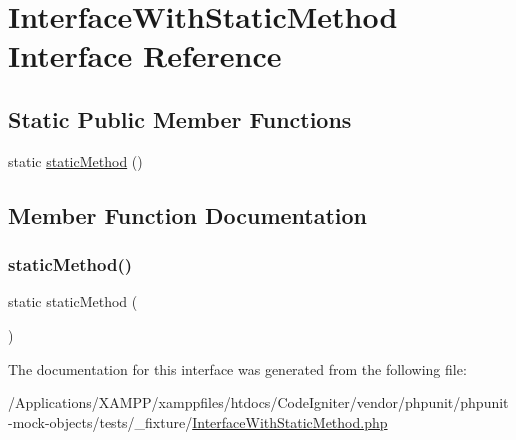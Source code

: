 \hypertarget{interface_interface_with_static_method}{}\section{Interface\+With\+Static\+Method Interface Reference}
\label{interface_interface_with_static_method}
\subsection*{Static Public Member Functions}
\begin{DoxyCompactItemize}
\item 
static \mbox{\hyperlink{interface_interface_with_static_method_a15469694bbe0f96a3e717f2796a00330}{static\+Method}} ()
\end{DoxyCompactItemize}


\subsection{Member Function Documentation}
\mbox{\label{interface_interface_with_static_method_a15469694bbe0f96a3e717f2796a00330}} 
\subsubsection{\texorpdfstring{static\+Method()}{staticMethod()}}
{\footnotesize\ttfamily static static\+Method (\begin{DoxyParamCaption}{ }\end{DoxyParamCaption})\hspace{0.3cm}{\ttfamily [static]}}



The documentation for this interface was generated from the following file\+:\begin{DoxyCompactItemize}
\item 
/\+Applications/\+X\+A\+M\+P\+P/xamppfiles/htdocs/\+Code\+Igniter/vendor/phpunit/phpunit-\/mock-\/objects/tests/\+\_\+fixture/\mbox{\hyperlink{_interface_with_static_method_8php}{Interface\+With\+Static\+Method.\+php}}\end{DoxyCompactItemize}
